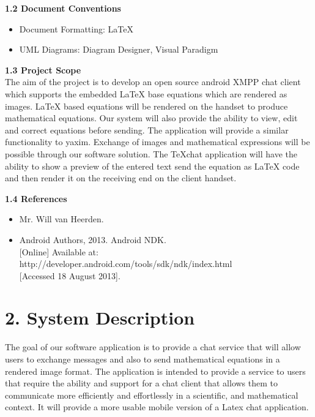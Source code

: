 \documentclass[29pt,a4paper]{moderncv}
\begin{document}
		\noindent \textbf{1.2 Document Conventions}
			\begin{itemize}
				\item Document Formatting: LaTeX
				\item UML Diagrams: Diagram Designer, Visual Paradigm
			\end{itemize}
		\vspace{5mm}
		
		\noindent \textbf{1.3 Project Scope}
			\\The aim of the project is to develop an open source android XMPP chat client which supports the embedded LaTeX base equations which are rendered as images. LaTeX based equations will be rendered on the handset to produce mathematical equations. Our system will also provide the ability to view, edit and correct equations before sending.
			\parindent 5mm The application will provide a similar functionality to yaxim. Exchange of images and mathematical expressions will be possible through our software solution. The TeXchat application will have the ability to show a preview of the entered text send the equation as LaTeX code and then render it on the receiving end on the client handset.
			
		\vspace{5mm}
		
	\noindent \textbf{1.4 References}
		\begin{itemize}
		\item Mr. Will van Heerden.
		\item Android Authors, 2013. Android NDK.\\ {[Online]} Available at: http://developer.android.com/tools/sdk/ndk/index.html
			\\{[Accessed 18 August 2013].}
		\end{itemize}
		\vspace{5mm}
		
\newpage
	\section*{\textbf{2. System Description}}
	\vspace{4mm}
		\noindent The goal of our software application is to provide a chat service that will allow users to exchange messages and also to send mathematical equations in a rendered image format.  The application is intended to provide a service to users that require the ability and support for a chat client that allows them to communicate more efficiently and effortlessly in a scientific, and mathematical context.  It will provide a more usable mobile version of a Latex chat application.\\ 
		
\end{document}
